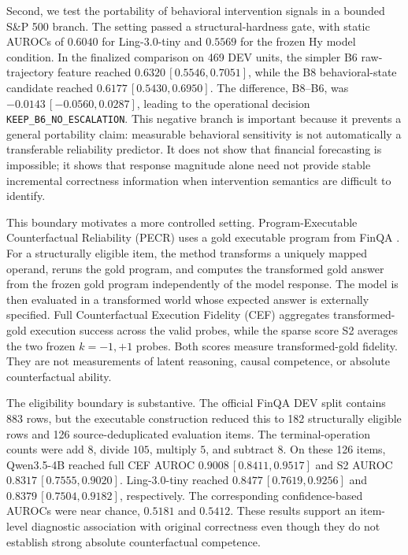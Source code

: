 \documentclass[11pt]{article}
\begin{document}
Second, we test the portability of behavioral intervention signals in a bounded S\&P 500 branch. The setting passed a structural-hardness gate, with static AUROCs of \(0.6040\) for Ling-3.0-tiny and \(0.5569\) for the frozen Hy model condition. In the finalized comparison on 469 DEV units, the simpler B6 raw-trajectory feature reached \(0.6320\,[0.5546,0.7051]\), while the B8 behavioral-state candidate reached \(0.6177\,[0.5430,0.6950]\). The difference, B8--B6, was \(-0.0143\,[-0.0560,0.0287]\), leading to the operational decision \texttt{KEEP\_B6\_NO\_ESCALATION}. This negative branch is important because it prevents a general portability claim: measurable behavioral sensitivity is not automatically a transferable reliability predictor. It does not show that financial forecasting is impossible; it shows that response magnitude alone need not provide stable incremental correctness information when intervention semantics are difficult to identify.

This boundary motivates a more controlled setting. Program-Executable Counterfactual Reliability (PECR) uses a gold executable program from FinQA \citep{chen-etal-2021-finqa}. For a structurally eligible item, the method transforms a uniquely mapped operand, reruns the gold program, and computes the transformed gold answer from the frozen gold program independently of the model response. The model is then evaluated in a transformed world whose expected answer is externally specified. Full Counterfactual Execution Fidelity (CEF) aggregates transformed-gold execution success across the valid probes, while the sparse score S2 averages the two frozen \(k=-1,+1\) probes. Both scores measure transformed-gold fidelity. They are not measurements of latent reasoning, causal competence, or absolute counterfactual ability.

The eligibility boundary is substantive. The official FinQA DEV split contains 883 rows, but the executable construction reduced this to 182 structurally eligible rows and 126 source-deduplicated evaluation items. The terminal-operation counts were add \(8\), divide \(105\), multiply \(5\), and subtract \(8\). On these 126 items, Qwen3.5-4B reached full CEF AUROC \(0.9008\,[0.8411,0.9517]\) and S2 AUROC \(0.8317\,[0.7555,0.9020]\). Ling-3.0-tiny reached \(0.8477\,[0.7619,0.9256]\) and \(0.8379\,[0.7504,0.9182]\), respectively. The corresponding confidence-based AUROCs were near chance, \(0.5181\) and \(0.5412\). These results support an item-level diagnostic association with original correctness even though they do not establish strong absolute counterfactual competence.
\end{document}
